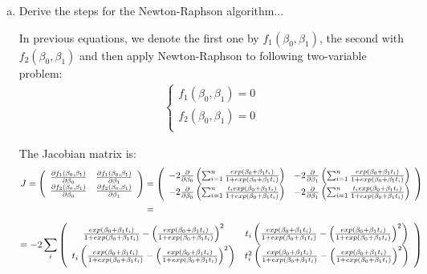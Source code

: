 \documentclass[12pt]{article}
\begin{document}
\begin{enumerate}[(a)]
\item  Derive the steps for the Newton-Raphson algorithm...

In previous equations, we denote the first one by $f_1(\beta_0, \beta_1)$, the second with $f_2(\beta_0, \beta_1)$ and then apply Newton-Raphson to following two-variable problem:
\begin{align*}
    \begin{cases} 
         f_1(\beta_0, \beta_1) = 0\\
         f_2(\beta_0, \beta_1) =  0\\
    \end{cases}
\end{align*}

The Jacobian matrix is:
\begin{align*}
J =
\left( {\begin{array}{*{20}c}
\frac{\partial f_1(\beta_0, \beta_1) }{\partial \beta_0}&\frac{\partial f_1(\beta_0, \beta_1) }{\partial \beta_1}\\
\frac{\partial f_2(\beta_0, \beta_1) }{\partial \beta_0}&\frac{\partial f_2(\beta_0, \beta_1) } {\partial \beta_1}\\
 \end{array} } \right) &=
\left( {\begin{array}{*{20}c}
 - 2 \frac{\partial  }{\partial \beta_0} \left(\sum_{i=1}^n \frac{ exp(\beta_0 + \beta_1 t_i) } {1 + exp(\beta_0 + \beta_1 t_i) } \right) & - 2 \frac{\partial }{\partial \beta_1} \left(\sum_{i=1}^n \frac{ exp(\beta_0 + \beta_1 t_i) } {1 + exp(\beta_0 + \beta_1 t_i) } \right) \\
- 2 \frac{\partial  }{\partial \beta_0} \left( \sum_{i=1}^n \frac{ t_i exp(\beta_0 + \beta_1 t_i) } {1 + exp(\beta_0 + \beta_1 t_i) } \right) & - 2 \frac{\partial  } {\partial \beta_1}  \left( \sum_{i=1}^n \frac{ t_i exp(\beta_0 + \beta_1 t_i) } {1 + exp(\beta_0 + \beta_1 t_i) } \right) \\
 \end{array} } \right)  \\ &= 
 \end{align*}
 \begin{align*}
 = -2 \sum_i
\left( {\begin{array}{*{20}c}
\frac{ exp(\beta_0 + \beta_1 t_i) } {1 + exp(\beta_0 + \beta_1 t_i) } - \left(  \frac{ exp(\beta_0 + \beta_1 t_i) } {1 + exp(\beta_0 + \beta_1 t_i) }\right)^2    & t_i \left(\frac{ exp(\beta_0 + \beta_1 t_i) } {1 + exp(\beta_0 + \beta_1 t_i) } - \left(  \frac{ exp(\beta_0 + \beta_1 t_i) } {1 + exp(\beta_0 + \beta_1 t_i) }\right)^2\right)\\
t_i \left(\frac{ exp(\beta_0 + \beta_1 t_i) } {1 + exp(\beta_0 + \beta_1 t_i) } - \left(  \frac{ exp(\beta_0 + \beta_1 t_i) } {1 + exp(\beta_0 + \beta_1 t_i) }\right)^2\right) & t_i^2 \left(\frac{ exp(\beta_0 + \beta_1 t_i) } {1 + exp(\beta_0 + \beta_1 t_i) } - \left(  \frac{ exp(\beta_0 + \beta_1 t_i) } {1 + exp(\beta_0 + \beta_1 t_i) }\right)^2\right)\\
 \end{array} } \right)
\end{align*}


\end{enumerate}
\end{document}
